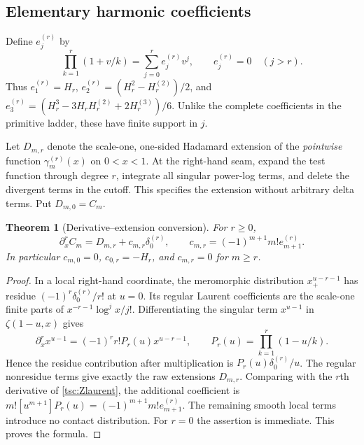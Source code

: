 \documentclass[11pt]{article}
\numberwithin{equation}{section}
\newtheorem{theorem}{Theorem}[section]
\theoremstyle{definition}\newtheorem{definition}[theorem]{Definition}
\theoremstyle{remark}\newtheorem{remark}[theorem]{Remark}
\begin{document}
\subsection{Elementary harmonic coefficients}
Define $e_j^{(r)}$ by
\begin{equation}\label{tsc:elementary}
 \prod_{k=1}^r(1+v/k)=\sum_{j=0}^r e_j^{(r)}v^j,
 \qquad e_j^{(r)}=0\quad(j>r).
\end{equation}
Thus $e_1^{(r)}=H_r$,
$e_2^{(r)}=(H_r^2-H_r^{(2)})/2$, and
$e_3^{(r)}=(H_r^3-3H_rH_r^{(2)}+2H_r^{(3)})/6$.
Unlike the complete coefficients in the primitive ladder, these have finite
support in $j$.

Let $D_{m,r}$ denote the scale-one, one-sided Hadamard extension of the
\emph{pointwise} function $\gamma_m^{(r)}(x)$ on $0<x<1$. At the right-hand
seam, expand the test function through degree $r$, integrate all singular
power-log terms, and delete the divergent terms in the cutoff. This
specifies the extension without arbitrary delta terms. Put $D_{m,0}=C_m$.

\begin{theorem}[Derivative--extension conversion]\label{tsc:contact-single}
For $r\ge0$,
\begin{equation}\label{tsc:single-contact}
 \partial_x^r C_m=D_{m,r}+c_{m,r}\delta_0^{(r)},
 \qquad c_{m,r}=(-1)^{m+1}m!e_{m+1}^{(r)}.
\end{equation}
In particular $c_{m,0}=0$, $c_{0,r}=-H_r$, and $c_{m,r}=0$ for $m\ge r$.
\end{theorem}
\begin{proof}
In a local right-hand coordinate, the meromorphic distribution
$x_+^{u-r-1}$ has residue
$(-1)^r\delta_0^{(r)}/r!$ at $u=0$. Its regular Laurent coefficients
are the scale-one finite parts of $x^{-r-1}\log^j x/j!$.
Differentiating the singular term $x^{u-1}$ in
$\zeta(1-u,x)$ gives
\[
 \partial_x^r x^{u-1}=(-1)^r r!P_r(u)x^{u-r-1},
 \qquad P_r(u)=\prod_{k=1}^r(1-u/k).
\]
Hence the residue contribution after multiplication is
$P_r(u)\delta_0^{(r)}/u$. The regular nonresidue terms give exactly the
raw extensions $D_{m,r}$. Comparing with the $r$th derivative of
\eqref{tsc:Zlaurent}, the additional coefficient is
$m![u^{m+1}]P_r(u)=(-1)^{m+1}m!e_{m+1}^{(r)}$.
The remaining smooth local terms introduce no contact distribution.
For $r=0$ the assertion is immediate. This proves the formula.
\end{proof}
\end{document}

